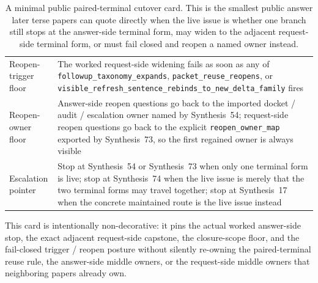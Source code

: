 \documentclass[11pt]{article}
\begin{document}
\begin{table}[t]
\begin{tabularx}{\linewidth}{@{}lX@{}}
Reopen-trigger floor & The worked request-side widening fails as soon as any of \nolinkurl{followup_taxonomy_expands}, \nolinkurl{packet_reuse_reopens}, or \nolinkurl{visible_refresh_sentence_rebinds_to_new_delta_family} fires \\
Reopen-owner floor & Answer-side reopen questions go back to the imported docket / audit / escalation owner named by Synthesis~54; request-side reopen questions go back to the explicit \nolinkurl{reopen_owner_map} exported by Synthesis~73, so the first regained owner is always visible \\
Escalation pointer & Stop at Synthesis~54 or Synthesis~73 when only one terminal form is live; stop at Synthesis~74 when the live issue is merely that the two terminal forms may travel together; stop at Synthesis~17 when the concrete maintained route is the live issue instead \\
\bottomrule
\end{tabularx}
\caption{A minimal public paired-terminal cutover card. This is the smallest public answer later terse papers can quote directly when the live issue is whether one branch still stops at the answer-side terminal form, may widen to the adjacent request-side terminal form, or must fail closed and reopen a named owner instead.}
\label{tab:minimal-public-paired-terminal-cutover-card}
\end{table}

This card is intentionally non-decorative: it pins the actual worked answer-side stop, the exact adjacent request-side capstone, the closure-scope floor, and the fail-closed trigger / reopen posture without silently re-owning the paired-terminal reuse rule, the answer-side middle owners, or the request-side middle owners that neighboring papers already own.\cite{series:workedexample}
\end{document}

